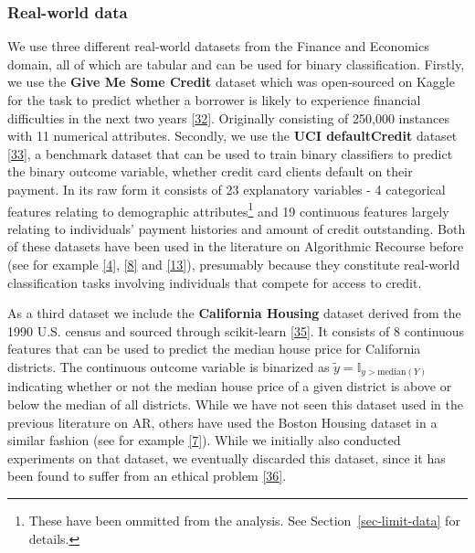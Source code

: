 \documentclass[
  conference]{IEEEtran}
\begin{document}
\hypertarget{real-world-data}{%
\subsubsection{Real-world data}\label{real-world-data}}

We use three different real-world datasets from the Finance and
Economics domain, all of which are tabular and can be used for binary
classification. Firstly, we use the \textbf{Give Me Some Credit} dataset
which was open-sourced on Kaggle for the task to predict whether a
borrower is likely to experience financial difficulties in the next two
years \protect\hyperlink{ref-gmsc_data}{{[}32{]}}. Originally consisting
of 250,000 instances with 11 numerical attributes. Secondly, we use the
\textbf{UCI defaultCredit} dataset
\protect\hyperlink{ref-yeh2009comparisons}{{[}33{]}}, a benchmark
dataset that can be used to train binary classifiers to predict the
binary outcome variable, whether credit card clients default on their
payment. In its raw form it consists of 23 explanatory variables - 4
categorical features relating to demographic attributes\footnote{These
  have been ommitted from the analysis. See Section~\ref{sec-limit-data}
  for details.} and 19 continuous features largely relating to
individuals' payment histories and amount of credit outstanding. Both of
these datasets have been used in the literature on Algorithmic Recourse
before (see for example
\protect\hyperlink{ref-pawelczyk2021carla}{{[}4{]}},
\protect\hyperlink{ref-joshi2019towards}{{[}8{]}} and
\protect\hyperlink{ref-ustun2019actionable}{{[}13{]}}), presumably
because they constitute real-world classification tasks involving
individuals that compete for access to credit.

As a third dataset we include the \textbf{California Housing} dataset
derived from the 1990 U.S. census and sourced through scikit-learn
\protect\hyperlink{ref-pace1997sparse}{{[}35{]}}. It consists of 8
continuous features that can be used to predict the median house price
for California districts. The continuous outcome variable is binarized
as \(\tilde{y}=\mathbb{I}_{y>\text{median}(Y)}\) indicating whether or
not the median house price of a given district is above or below the
median of all districts. While we have not seen this dataset used in the
previous literature on AR, others have used the Boston Housing dataset
in a similar fashion (see for example
\protect\hyperlink{ref-schut2021generating}{{[}7{]}}). While we
initially also conducted experiments on that dataset, we eventually
discarded this dataset, since it has been found to suffer from an
ethical problem \protect\hyperlink{ref-carlisle2019racist}{{[}36{]}}.
\end{document}
